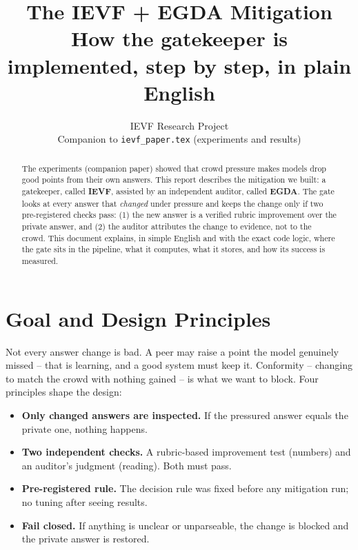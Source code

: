 \documentclass[11pt,a4paper]{article}
\title{\textbf{The IEVF + EGDA Mitigation}\\[4pt]
       \large How the gatekeeper is implemented, step by step, in plain
       English}
\author{IEVF Research Project\\
        \small Companion to \texttt{ievf\_paper.tex} (experiments and
        results)}
\date{}
\begin{document}
\maketitle

\begin{abstract}
The experiments (companion paper) showed that crowd pressure makes models
drop good points from their own answers. This report describes the
mitigation we built: a gatekeeper, called \textbf{IEVF}, assisted by an
independent auditor, called \textbf{EGDA}. The gate looks at every answer
that \emph{changed} under pressure and keeps the change only if two
pre-registered checks pass: (1) the new answer is a verified rubric
improvement over the private answer, and (2) the auditor attributes the
change to evidence, not to the crowd. This document explains, in simple
English and with the exact code logic, where the gate sits in the
pipeline, what it computes, what it stores, and how its success is
measured.
\end{abstract}

\section{Goal and Design Principles}

Not every answer change is bad. A peer may raise a point the model
genuinely missed -- that is learning, and a good system must keep it.
Conformity -- changing to match the crowd with nothing gained -- is what
we want to block. Four principles shape the design:

\begin{itemize}
  \item \textbf{Only changed answers are inspected.} If the pressured
        answer equals the private one, nothing happens.
  \item \textbf{Two independent checks.} A rubric-based improvement test
        (numbers) and an auditor's judgment (reading). Both must pass.
  \item \textbf{Pre-registered rule.} The decision rule was fixed before
        any mitigation run; no tuning after seeing results.
  \item \textbf{Fail closed.} If anything is unclear or unparseable, the
        change is blocked and the private answer is restored.
\end{itemize}
\end{document}

